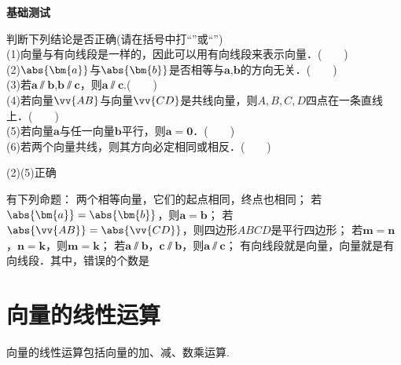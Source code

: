   \begin{exercise}{\textbf{基础测试}}
    \item
      判断下列结论是否正确(请在括号中打“\checkmark”或“\XSolidBrush”)\\
      (1)向量与有向线段是一样的，因此可以用有向线段来表示向量．(　　)\\
      (2)$\abs{\bm{a}}$与$\abs{\bm{b}}$是否相等与$\bm{a}$,$\bm{b}$的方向无关．(　　)\\
      (3)若$\bm{a}\varparallel\bm{b}$,$\bm{b}\varparallel\bm{c}$，则$\bm{a}\varparallel\bm{c}$.(　　)\\
      (4)若向量$\vv{AB}$与向量$\vv{CD}$是共线向量，则$A,B,C,D$四点在一条直线上．(　　)\\
      (5)若向量$\bm a$与任一向量$\bm b$平行，则$\bm a=\bm 0$．(　　)\\
      (6)若两个向量共线，则其方向必定相同或相反．(　　)\\
      \begin{answer}
        (2)(5)正确
      \end{answer}
    \item
      有下列命题：
      两个相等向量，它们的起点相同，终点也相同；
      若$\abs{\bm{a}}=\abs{\bm{b}}$，则$\bm{a}=\bm{b}$；
      若$\abs{\vv{AB}}=\abs{\vv{CD}}$，则四边形$ABCD$是平行四边形；
      若$\bm{m}=\bm{n}$，$\bm{n}=\bm{k}$，则$\bm{m}=\bm{k}$；
      若$\bm{a}\varparallel\bm{b}$，$\bm{c}\varparallel\bm{b}$，则$\bm{a}\varparallel\bm{c}$；
      有向线段就是向量，向量就是有向线段．其中，错误的个数是\xz
  \end{exercise}
\section{向量的线性运算}
  向量的线性运算包括向量的加、减、数乘运算.

